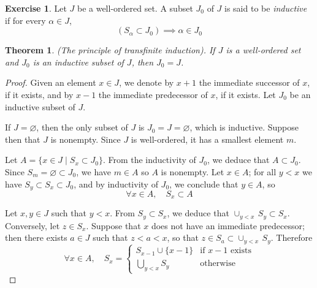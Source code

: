 \documentclass[11pt,a4paper,twoside]{article}
\theoremstyle{definition}
\newcounter{excounter}
\newtheorem{exercise}[excounter]{Exercise}
\theoremstyle{plain}
\newtheorem*{theorem}{Theorem}
\begin{document}
\begin{exercise}

  Let $J$ be a well-ordered set. A subset $J_0$ of $J$ is said to be \emph{inductive} if for every $\alpha \in J$,
  \begin{equation*}
    ( S_\alpha \subset J_0 ) \implies \alpha \in J_0
  \end{equation*}

  \begin{theorem}
    (The principle of transfinite induction). If $J$ is a well-ordered set and $J_0$ is an inductive subset of $J$, then $J_0 = J$.
  \end{theorem}

\end{exercise}

\begin{proof}

  Given an element $x \in J$, we denote by $x + 1$ the immediate successor of $x$, if it exists, and by $x - 1$ the
  immediate predecessor of $x$, if it exists. Let $J_0$ be an inductive subset of $J$.

  If $J = \varnothing$, then the only subset of $J$ is $J_0 = J = \varnothing$, which is inductive. Suppose then that $J$ is nonempty.
  Since $J$ is well-ordered, it has a smallest element $m$.

  Let $A = \{ x \in J \mid S_x \subset J_0 \}$. From the inductivity of $J_0$, we deduce that $A \subset J_0$.
  Since $S_m = \varnothing \subset J_0$, we have $m \in A$ so $A$ is nonempty.
  Let $x \in A$; for all $y < x$ we have $S_y \subset S_x \subset J_0$, and by inductivity of $J_0$, we conclude that $y \in A$, so
  \begin{equation} \label{A_has_all_sections}
    \forall x \in A, \quad S_x \subset A
  \end{equation}

  Let $x, y \in J$ such that $y < x$. From $S_y \subset S_x$, we deduce that $\cup_{y < x} \, S_y \subset S_x$. Conversely, let $z \in S_x$.
  Suppose that $x$ does not have an immediate predecessor; then there exists $a \in J$ such that $z < a < x$, so that $z \in S_a \subset \cup_{y < x} \, S_y$.
  Therefore
  \begin{equation} \label{section_structure}
    \forall x \in A, \quad S_x = \begin{cases}
      S_{x - 1} \cup \{ x - 1 \} &\text{if } x - 1 \text{ exists} \\
      \bigcup_{y < x} S_y &\text{otherwise}
    \end{cases}
  \end{equation}


\end{proof}
\end{document}
